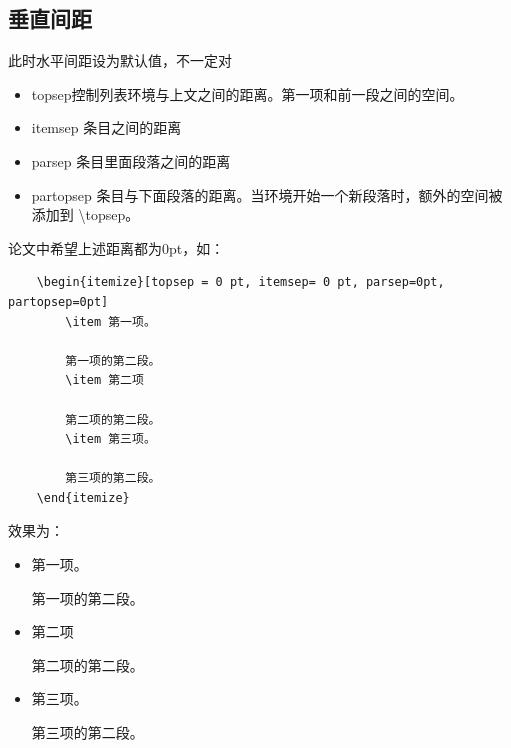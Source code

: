 \subsection{垂直间距}
此时水平间距设为默认值，不一定对
\begin{itemize}[topsep = 0 pt, itemsep= 0 pt, parsep=0pt, partopsep=0pt]
	\item topsep控制列表环境与上文之间的距离。第一项和前一段之间的空间。

	\item itemsep 条目之间的距离

	\item parsep 条目里面段落之间的距离
 
	\item partopsep 条目与下面段落的距离。当环境开始一个新段落时，额外的空间被添加到 \textbackslash{}topsep。
\end{itemize}

论文中希望上述距离都为0pt，如：
\begin{lstlisting}
	\begin{itemize}[topsep = 0 pt, itemsep= 0 pt, parsep=0pt, partopsep=0pt]
		\item 第一项。
    
		第一项的第二段。
		\item 第二项
		
		第二项的第二段。
		\item 第三项。
		
		第三项的第二段。
	\end{itemize}
\end{lstlisting}
效果为：
\begin{itemize}[topsep = 0 pt, itemsep= 0 pt, parsep=0pt, partopsep=0pt]
	\item 第一项。

	第一项的第二段。
	\item 第二项
	
	第二项的第二段。
	\item 第三项。
	
	第三项的第二段。
\end{itemize}


